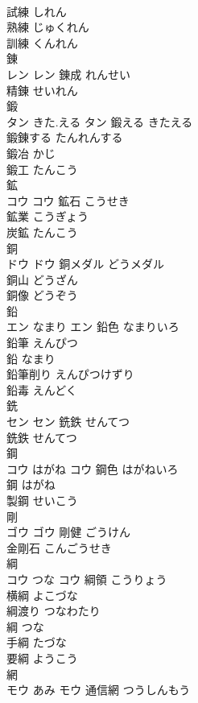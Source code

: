 \documentclass[8pt]{extreport}
\begin{document}
\begin{CJK}{UTF8}{min}
\\	試練	しれん	
\\	熟練	じゅくれん	
\\	訓練	くんれん	
\\	錬	
\\	レン		レン	錬成	れんせい	
\\	精錬	せいれん	
\\	鍛	
\\	タン	きた.える	タン	鍛える	きたえる	
\\	鍛錬する	たんれんする	
\\	鍛冶	かじ	
\\	鍛工	たんこう	
\\	鉱	
\\	コウ		コウ	鉱石	こうせき	
\\	鉱業	こうぎょう	
\\	炭鉱	たんこう	
\\	銅	
\\	ドウ		ドウ	銅メダル	どうメダル	
\\	銅山	どうざん	
\\	銅像	どうぞう	
\\	鉛	
\\	エン	なまり	エン	鉛色	なまりいろ	
\\	鉛筆	えんぴつ	
\\	鉛	なまり	
\\	鉛筆削り	えんぴつけずり	
\\	鉛毒	えんどく	
\\	銑	
\\	セン		セン	銑鉄	せんてつ	
\\	銑鉄	せんてつ	
\\	鋼	
\\	コウ	はがね	コウ	鋼色	はがねいろ	
\\	鋼	はがね	
\\	製鋼	せいこう	
\\	剛	
\\	ゴウ		ゴウ	剛健	ごうけん	
\\	金剛石	こんごうせき	
\\	綱	
\\	コウ	つな	コウ	綱領	こうりょう	
\\	横綱	よこづな	
\\	綱渡り	つなわたり	
\\	綱	つな	
\\	手綱	たづな	
\\	要綱	ようこう	
\\	網	
\\	モウ	あみ	モウ	通信網	つうしんもう	

\end{CJK}
\end{document}
